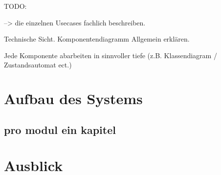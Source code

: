 \newpage
TODO: 

--> die einzelnen Usecases fachlich beschreiben.

Technische Sicht. 
Komponentendiagramm Allgemein erklären.

Jede Komponente abarbeiten in sinnvoller tiefe (z.B. Klassendiagram / Zustandsautomat ect.)









\section{Aufbau des Systems}

\subsection{pro modul ein kapitel}

\section{Ausblick}

